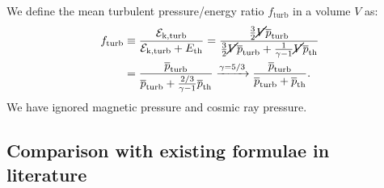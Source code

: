 \documentclass[]{article}
\begin{document}
We define the mean turbulent pressure/energy ratio $f_{\mathrm{turb}}$ in a volume $V$ as:
%
\begin{align}
	f_{\mathrm{turb}} &\equiv \frac{\mathcal{E}_{\mathrm{k,turb}}}{\mathcal{E}_{\mathrm{k,turb}} + E_{\mathrm{th}}} =  \frac{\frac{3}{2} \cancel{V} \overline{p}_{\mathrm{turb}}}{\frac{3}{2} \cancel{V} \overline{p}_{\mathrm{turb}} + \frac{1}{\gamma - 1} \cancel{V} \overline{p}_{\mathrm{th}}} \nonumber \\
	&= \frac{ \overline{p}_{\mathrm{turb}}}{ \overline{p}_{\mathrm{turb}} + \frac{2/3}{\gamma - 1}  \overline{p}_{\mathrm{th}}} \xrightarrow{\gamma = 5/3} \frac{ \overline{p}_{\mathrm{turb}}}{ \overline{p}_{\mathrm{turb}} +   \overline{p}_{\mathrm{th}}}.
\end{align}
%
We have ignored magnetic pressure and cosmic ray pressure.

\subsection{Comparison with existing formulae in literature}
\end{document}
